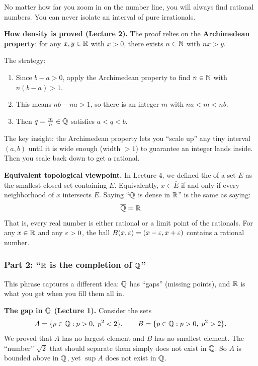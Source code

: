 \documentclass[../master/master.tex]{subfiles}
\begin{document}
No matter how far you zoom in on the number line, you will always find rational numbers. You can never isolate an interval of pure irrationals.

\begin{notebox}
\textbf{How density is proved (Lecture 2).} The proof relies on the \textbf{Archimedean property}: for any $x, y \in \mathbb{R}$ with $x > 0$, there exists $n \in \mathbb{N}$ with $nx > y$.

The strategy:
\begin{enumerate}
    \item Since $b - a > 0$, apply the Archimedean property to find $n \in \mathbb{N}$ with $n(b - a) > 1$.
    \item This means $nb - na > 1$, so there is an integer $m$ with $na < m < nb$.
    \item Then $q = \frac{m}{n} \in \mathbb{Q}$ satisfies $a < q < b$.
\end{enumerate}
The key insight: the Archimedean property lets you ``scale up'' any tiny interval $(a,b)$ until it is wide enough (width $> 1$) to guarantee an integer lands inside. Then you scale back down to get a rational.
\end{notebox}

\textbf{Equivalent topological viewpoint.} In Lecture 4, we defined the  of a set $E$ as the smallest closed set containing $E$. Equivalently, $x \in \overline{E}$ if and only if every neighborhood of $x$ intersects $E$. Saying ``$\mathbb{Q}$ is dense in $\mathbb{R}$'' is the same as saying:
\[
\overline{\mathbb{Q}} = \mathbb{R}
\]
That is, every real number is either rational or a limit point of the rationals. For any $x \in \mathbb{R}$ and any $\varepsilon > 0$, the ball $B(x, \varepsilon) = (x - \varepsilon, x + \varepsilon)$ contains a rational number.

\subsubsection*{Part 2: ``$\mathbb{R}$ is the completion of $\mathbb{Q}$''}

This phrase captures a different idea: $\mathbb{Q}$ has ``gaps'' (missing points), and $\mathbb{R}$ is what you get when you fill them all in.

\textbf{The gap in $\mathbb{Q}$ (Lecture 1).} Consider the sets
\[
A = \{p \in \mathbb{Q} : p > 0,\; p^2 < 2\}, \qquad B = \{p \in \mathbb{Q} : p > 0,\; p^2 > 2\}.
\]
We proved that $A$ has no largest element and $B$ has no smallest element. The ``number'' $\sqrt{2}$ that should separate them simply does not exist in $\mathbb{Q}$. So $A$ is bounded above in $\mathbb{Q}$, yet $\sup A$ does not exist in $\mathbb{Q}$.
\end{document}
